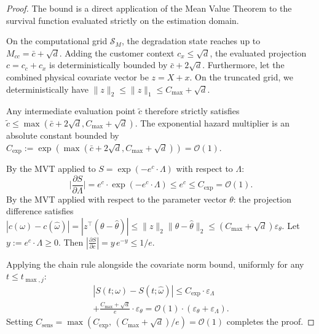 \documentclass[letterpaper, 10 pt, conference]{IEEEconf}
\newcommand{\what}[1]{\widehat{#1}}
\begin{document}
\begin{proof}
    The bound is a direct application of the Mean Value Theorem to the survival function evaluated strictly on the estimation domain.

    On the computational grid $\mathcal{S}_M$, the degradation state reaches up to $M_{cc} = \bar{c} + \sqrt{d}$. Adding the customer context $c_x \leq \sqrt{d}$, the evaluated projection $c = c_c + c_x$ is deterministically bounded by $\bar{c} + 2\sqrt{d}$. Furthermore, let the combined physical covariate vector be $z = X + x$. On the truncated grid, we deterministically have $\|z\|_2 \le \|z\|_1 \le C_{\max} + \sqrt{d}$.

    Any intermediate evaluation point $\tilde{c}$ therefore strictly satisfies $\tilde{c} \le \max(\bar{c} + 2\sqrt{d}, C_{\max} + \sqrt{d})$. The exponential hazard multiplier is an absolute constant bounded by $C_{\exp} := \exp(\max(\bar{c} + 2\sqrt{d}, C_{\max} + \sqrt{d})) = \mathcal{O}(1)$.

    By the MVT applied to $S = \exp(-e^c \cdot \Lambda)$ with respect to $\Lambda$:
    \begin{equation}
        \bigg|\frac{\partial S}{\partial \Lambda}\bigg| = e^c \cdot \exp(-e^c \cdot \Lambda) \leq e^c \leq C_{\exp} = \mathcal{O}(1).
    \end{equation}
    By the MVT applied with respect to the parameter vector $\theta$: the projection difference satisfies $|c(\omega) - c(\what{\omega})| = |z^\top (\theta - \what{\theta})| \le \|z\|_2 \|\theta - \what{\theta}\|_2 \le (C_{\max} + \sqrt{d}) \varepsilon_\theta$. Let $y := e^c \cdot \Lambda \geq 0$. Then $|\frac{\partial S}{\partial c}| = y\,e^{-y} \le 1/e$.

    Applying the chain rule alongside the covariate norm bound, uniformly for any $t \le t_{\max,j}$:
    \begin{multline}
        \label{eq:pfail_pointwise}
        |S(t; \omega) - S(t; \what{\omega})| \leq C_{\exp} \cdot \varepsilon_\Lambda \\
        + \tfrac{C_{\max} + \sqrt{d}}{e} \cdot \varepsilon_\theta = \mathcal{O}(1) \cdot (\varepsilon_\theta + \varepsilon_\Lambda).
    \end{multline}
    Setting $C_{\mathrm{sens}} = \max(C_{\exp},\, (C_{\max} + \sqrt{d})/e) = \mathcal{O}(1)$ completes the proof.
\end{proof}
\end{document}
